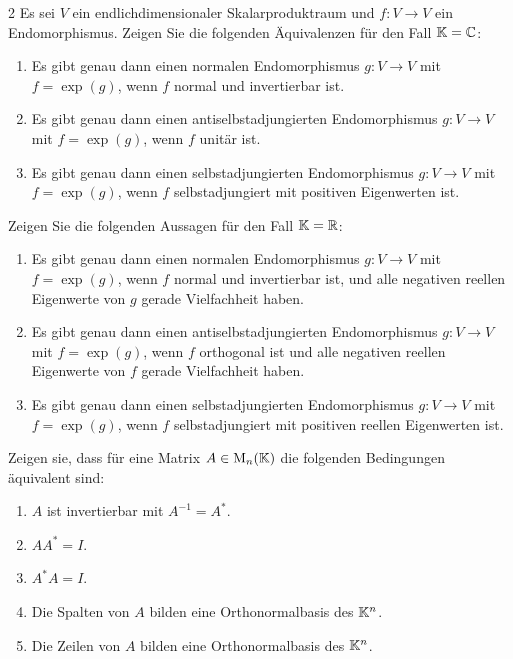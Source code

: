 \begin{question}[subtitle = Charakterisierung von Matrixexponentialen normaler Endomorphismen über Eigenwerte]{2}
  Es sei $V$ ein endlichdimensionaler Skalarproduktraum und $f \colon V \to V$ ein Endomorphismus.
  \newline
  Zeigen Sie die folgenden Äquivalenzen für den Fall $\mathbb{K} = \mathbb{C}$:
  \begin{enumerate}[leftmargin=*]
    \item
      Es gibt genau dann einen normalen Endomorphismus $g \colon V \to V$ mit $f = \exp(g)$, wenn $f$ normal und invertierbar ist.
    \item
      Es gibt genau dann einen antiselbstadjungierten Endomorphismus $g \colon V \to V$ mit $f = \exp(g)$, wenn $f$ unitär ist.
    \item
      Es gibt genau dann einen selbstadjungierten Endomorphismus $g \colon V \to V$ mit $f = \exp(g)$, wenn $f$ selbstadjungiert mit positiven Eigenwerten ist.
  \end{enumerate}
  Zeigen Sie die folgenden Aussagen für den Fall $\mathbb{K} = \mathbb{R}$:
  \begin{enumerate}[leftmargin=*, resume]
    \item
      Es gibt genau dann einen normalen Endomorphismus $g \colon V \to V$ mit $f = \exp(g)$, wenn $f$ normal und invertierbar ist, und alle negativen reellen Eigenwerte von $g$ gerade Vielfachheit haben.
    \item
      Es gibt genau dann einen antiselbstadjungierten Endomorphismus $g \colon V \to V$ mit $f = \exp(g)$, wenn $f$ orthogonal ist und alle negativen reellen Eigenwerte von $f$ gerade Vielfachheit haben.
    \item
      Es gibt genau dann einen selbstadjungierten Endomorphismus $g \colon V \to V$ mit $f = \exp(g)$, wenn $f$ selbstadjungiert mit positiven reellen Eigenwerten ist.
  \end{enumerate}
\end{question}







\begin{question}[subtitle = Die Definitionen unitäre Matrizen]{3}
Zeigen sie, dass für eine Matrix $A \in \operatorname{M}_n(\mathbb{K})$ die folgenden Bedingungen äquivalent sind:
  \begin{enumerate}
    \item
      $A$ ist invertierbar mit $A^{-1} = A^*$.
    \item
      $A A^* = I$.
    \item
      $A^* A = I$.
    \item
      Die Spalten von $A$ bilden eine Orthonormalbasis des $\mathbb{K}^n$.
    \item
      Die Zeilen von $A$ bilden eine Orthonormalbasis des $\mathbb{K}^n$.
  \end{enumerate}
\end{question}


